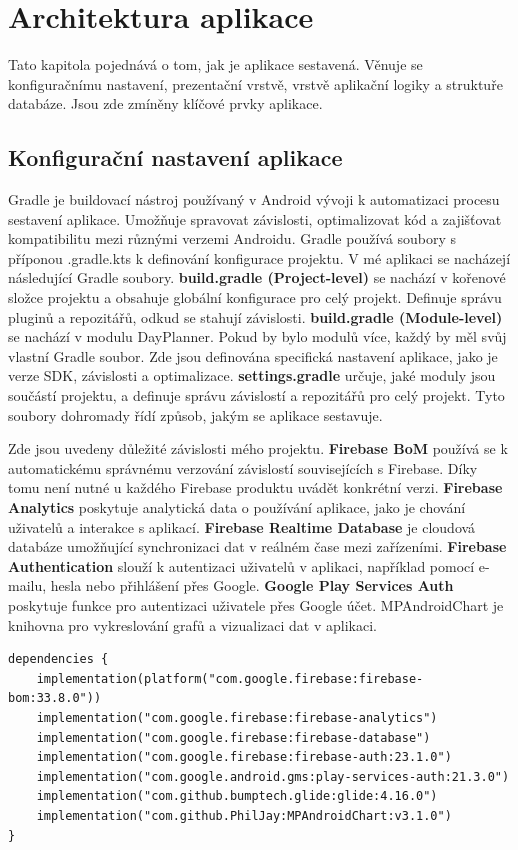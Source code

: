 \chapter{Architektura aplikace}
\hspace{14pt} Tato kapitola pojednává o tom, jak je aplikace sestavená. Věnuje se konfiguračnímu nastavení, prezentační vrstvě, vrstvě aplikační logiky a struktuře databáze. Jsou zde zmíněny klíčové prvky aplikace.
\section{Konfigurační nastavení aplikace}
\hspace{14pt} Gradle je buildovací nástroj používaný v Android vývoji k automatizaci procesu sestavení aplikace. Umožňuje spravovat závislosti, optimalizovat kód a zajišťovat kompatibilitu mezi různými verzemi Androidu. Gradle používá soubory s příponou .gradle.kts k definování konfigurace projektu. V mé aplikaci se nacházejí následující Gradle soubory. \textbf{build.gradle (Project-level)} se nachází v kořenové složce projektu a obsahuje globální konfigurace pro celý projekt. Definuje správu pluginů a repozitářů, odkud se stahují závislosti. \textbf{build.gradle (Module-level)} se nachází v modulu DayPlanner. Pokud by bylo modulů více, každý by měl svůj vlastní Gradle soubor. Zde jsou definována specifická nastavení aplikace, jako je verze SDK, závislosti a optimalizace. \textbf{settings.gradle} určuje, jaké moduly jsou součástí projektu, a definuje správu závislostí a repozitářů pro celý projekt. Tyto soubory dohromady řídí způsob, jakým se aplikace sestavuje.

\newpage

Zde jsou uvedeny důležité závislosti mého projektu. \textbf{Firebase BoM} používá se k automatickému správnému verzování závislostí souvisejících s Firebase. Díky tomu není nutné u každého Firebase produktu uvádět konkrétní verzi. \textbf{Firebase Analytics} poskytuje analytická data o používání aplikace, jako je chování uživatelů a interakce s aplikací.\textbf{ Firebase Realtime Database} je cloudová databáze umožňující synchronizaci dat v reálném čase mezi zařízeními. \textbf{Firebase Authentication} slouží k autentizaci uživatelů v aplikaci, například pomocí e-mailu, hesla nebo přihlášení přes Google. \textbf{Google Play Services Auth} poskytuje funkce pro autentizaci uživatele přes Google účet. MPAndroidChart je knihovna pro vykreslování grafů a vizualizaci dat v aplikaci.
\begin{lstlisting}[style=javastyle,caption = {build.gradle},label = {lst:build.gradle}]
dependencies {
    implementation(platform("com.google.firebase:firebase-bom:33.8.0"))
    implementation("com.google.firebase:firebase-analytics")
    implementation("com.google.firebase:firebase-database")
    implementation("com.google.firebase:firebase-auth:23.1.0")
    implementation("com.google.android.gms:play-services-auth:21.3.0")
    implementation("com.github.bumptech.glide:glide:4.16.0")
    implementation("com.github.PhilJay:MPAndroidChart:v3.1.0")
}
\end{lstlisting}

